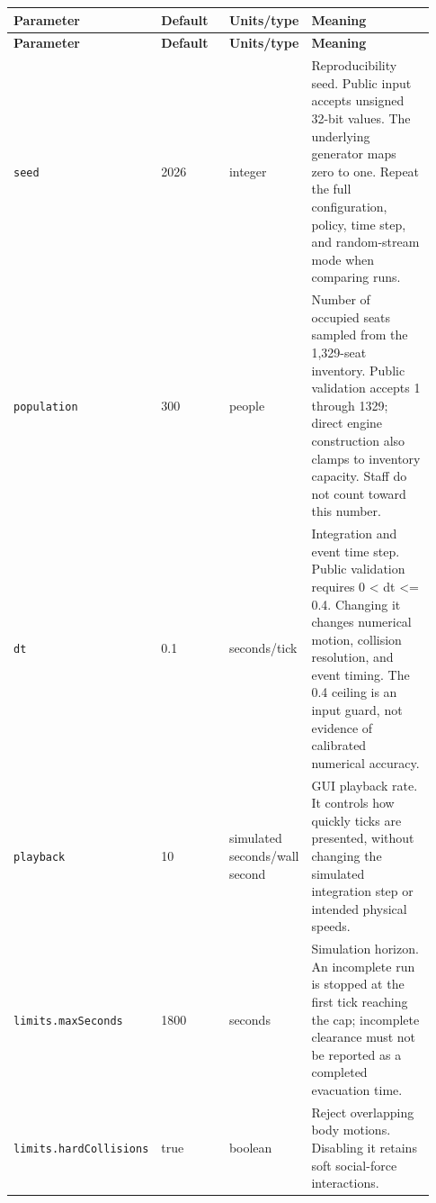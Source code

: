 \documentclass[11pt]{article}
\begin{document}
{\small\setlength{\tabcolsep}{4pt}

\begin{longtable}{@{}p{0.23\linewidth}p{0.19\linewidth}p{0.13\linewidth}p{0.38\linewidth}@{}}

\toprule

\textbf{Parameter} & \textbf{Default} & \textbf{Units/type} & \textbf{Meaning} \\

\midrule\endfirsthead

\toprule

\textbf{Parameter} & \textbf{Default} & \textbf{Units/type} & \textbf{Meaning} \\

\midrule\endhead

\bottomrule\endfoot

\texttt{seed} & 2026 & integer & Reproducibility seed. Public input accepts unsigned 32-bit values. The underlying generator maps zero to one. Repeat the full configuration, policy, time step, and random-stream mode when comparing runs. \\

\texttt{population} & 300 & people & Number of occupied seats sampled from the 1,329-seat inventory. Public validation accepts 1 through 1329; direct engine construction also clamps to inventory capacity. Staff do not count toward this number. \\

\texttt{dt} & 0.1 & seconds/tick & Integration and event time step. Public validation requires 0 < dt <= 0.4. Changing it changes numerical motion, collision resolution, and event timing. The 0.4 ceiling is an input guard, not evidence of calibrated numerical accuracy. \\

\texttt{playback} & 10 & simulated seconds/wall second & GUI playback rate. It controls how quickly ticks are presented, without changing the simulated integration step or intended physical speeds. \\

\texttt{limits.\allowbreak{}max\allowbreak{}Seconds} & 1800 & seconds & Simulation horizon. An incomplete run is stopped at the first tick reaching the cap; incomplete clearance must not be reported as a completed evacuation time. \\

\texttt{limits.\allowbreak{}hard\allowbreak{}Collisions} & true & boolean & Reject overlapping body motions. Disabling it retains soft social-force interactions. \\


\end{longtable}}
\end{document}

